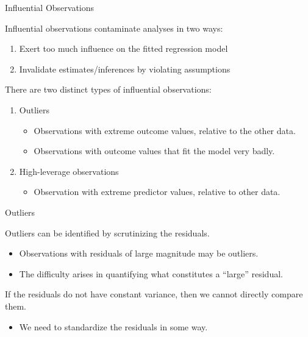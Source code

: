 \documentclass[10pt]{beamer}\usepackage[]{graphicx}\usepackage[]{color}
\begin{document}


\begin{frame}{Influential Observations}

  Influential observations contaminate analyses in two ways:
  \vc
  \begin{enumerate}
  \item Exert too much influence on the fitted regression model
    \vc
  \item Invalidate estimates/inferences by violating assumptions
  \end{enumerate}
  \vb
  There are two distinct types of influential observations:
  \vc
  \begin{enumerate}
  \item Outliers
    \vc
    \begin{itemize}
    \item Observations with extreme outcome values, relative to the other data.
      \vc
    \item Observations with outcome values that fit the model very badly.
    \end{itemize}
    \vb
  \item High-leverage observations
    \vc
    \begin{itemize}
    \item Observation with extreme predictor values, relative to other data.
    \end{itemize}
  \end{enumerate}

\end{frame}


\begin{frame}{Outliers}

  Outliers can be identified by scrutinizing the residuals.
  \vc
  \begin{itemize}
  \item Observations with residuals of large magnitude may be outliers.
    \vc
  \item The difficulty arises in quantifying what constitutes a ``large''
    residual.
  \end{itemize}
  \vb
  If the residuals do not have constant variance, then we cannot directly
  compare them.
  \vc
  \begin{itemize}
  \item We need to standardize the residuals in some way.
  \end{itemize}

\end{frame}
\end{document}
